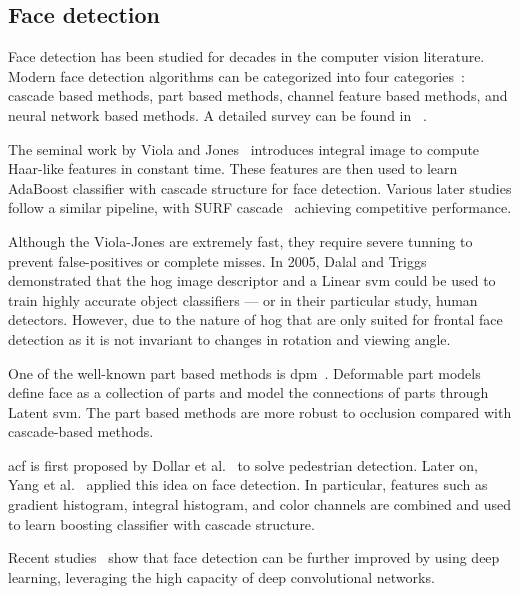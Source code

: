 \subsection{Face detection}
\label{sec:face-detection}
Face detection has been studied for decades in the computer
vision literature. Modern face detection algorithms can be categorized into four categories~\cite{yang2016wider}:
cascade based methods, part based methods, channel feature based methods, and
neural network based methods. A detailed survey can be found in
~\cite{yang2002detecting, zhang2010survey}.

The seminal work by Viola and Jones~\cite{viola2004robust}
introduces integral image to compute Haar-like features in constant time.
These features are then used to learn AdaBoost classifier with cascade structure
for face detection.
Various later studies follow a similar pipeline, with SURF
cascade~\cite{li2013learning} achieving competitive performance.

Although the Viola-Jones are extremely fast, they require severe tunning to
prevent false-positives or complete misses.
In 2005, Dalal and Triggs~\cite{dalal2005histograms} demonstrated that the \gls{hog} image descriptor and
a Linear \gls{svm} could be used to train highly accurate object classifiers ---
or in their particular study, human detectors. However, due to the nature of
\gls{hog} that are only suited for frontal face detection as it is not invariant
to changes in rotation and viewing angle.

One of the well-known part based methods is \gls{dpm}~\cite{felzenszwalb2009object}. Deformable part
models define face as a collection of parts and model the connections
of parts through Latent \gls{svm}.
The part based methods are more robust to occlusion compared
with cascade-based methods.

\gls{acf} is first proposed by Dollar et al.~\cite{dollar2009pedestrian} to solve pedestrian detection.
Later on, Yang et al.~\cite{yang2014aggregate} applied this idea on face
detection. In particular, features such as gradient histogram, integral
histogram, and color channels are combined and used to learn boosting classifier
with cascade structure.

Recent studies~\cite{li2015convolutional, yang2015facial} show that face
detection can be further improved by using deep learning, leveraging the high
capacity of deep convolutional networks.

